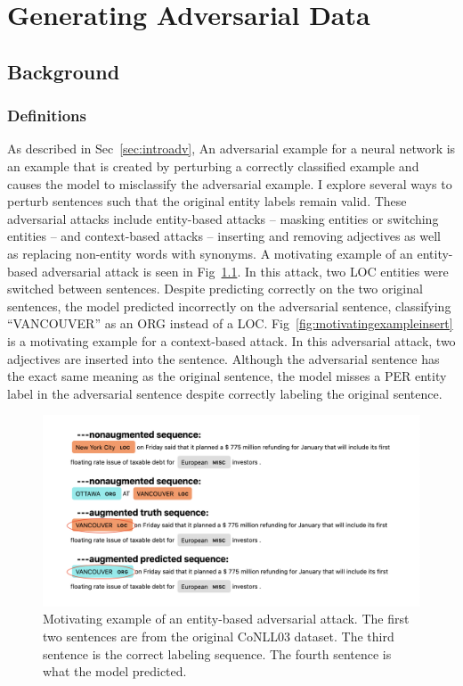 \chapter{Generating Adversarial Data}
\section{Background}
\subsection{Definitions}
As described in Sec~\ref{sec:introadv}, An adversarial example for a neural network is an example that is created by perturbing a correctly classified example and causes the model to misclassify the  adversarial example. I explore several ways to perturb sentences such that the original entity labels remain valid. These adversarial attacks include entity-based attacks -- masking entities or switching entities -- and context-based attacks -- inserting and removing adjectives as well as replacing non-entity words with synonyms. A motivating example of an entity-based adversarial attack is seen in Fig~\ref{fig:motivatingexampleswitch}. In this attack, two \textsc{LOC} entities were switched between sentences. Despite predicting correctly on the two original sentences, the model predicted incorrectly on the adversarial sentence, classifying ``VANCOUVER'' as an \textsc{ORG} instead of a \textsc{LOC}. Fig~\ref{fig:motivatingexampleinsert} is a motivating example for a context-based attack. In this adversarial attack, two adjectives are inserted into the sentence. Although the adversarial sentence has the exact same meaning as the original sentence, the model misses a \textsc{PER} entity label in the adversarial sentence despite correctly labeling the original sentence.

\begin{figure}[h]
	\centering
	\includegraphics[width=1\linewidth]{LatexDiss/figures/LOCmotivatingexample.png}
	\caption{Motivating example of an entity-based adversarial attack. The first two sentences are from the original CoNLL03 dataset. The third sentence is the correct labeling sequence. The fourth sentence is what the model predicted.}
	\label{fig:motivatingexampleswitch}
\end{figure}

